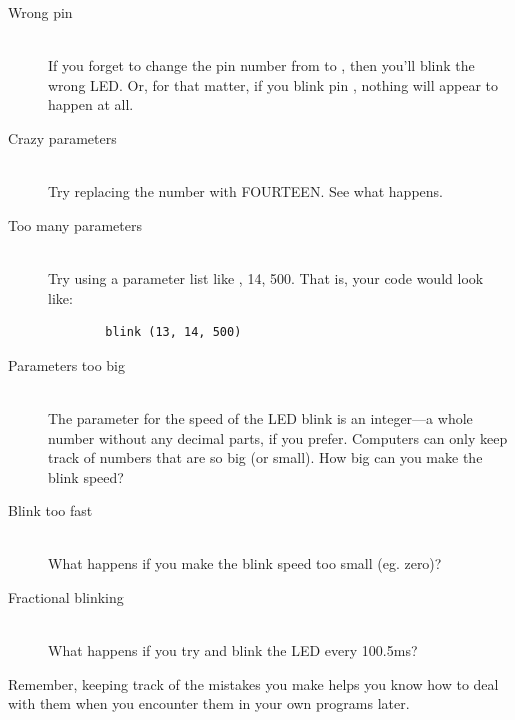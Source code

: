 \begin{description}
	\item[Wrong pin]\ \\
		If you forget to change the pin number from {} to {}, then you'll blink the wrong LED. Or, for that matter, if you blink pin {}, nothing will appear to happen at all.
	\item[Crazy parameters]\ \\
	Try replacing the number {} with {\code FOURTEEN}. See what happens. 
	\item[Too many parameters]\ \\
	Try using a parameter list like {, 14, 500}. That is, your code would look like:
	\begin{verbatim}
		blink (13, 14, 500)
	\end{verbatim}
	\item[Parameters too big]\ \\
	The parameter for the speed of the LED blink is an integer---a whole number without any decimal parts, if you prefer. Computers can only keep track of numbers that are so big (or small). How big can you make the blink speed? 
	\item[Blink too fast]\ \\
	What happens if you make the blink speed too small (eg. zero)?
	\item[Fractional blinking]\ \\
	What happens if you try and blink the LED every 100.5ms?
\end{description}

Remember, keeping track of the mistakes you make helps you know how to deal with them when you encounter them in your own programs later.


		



 


